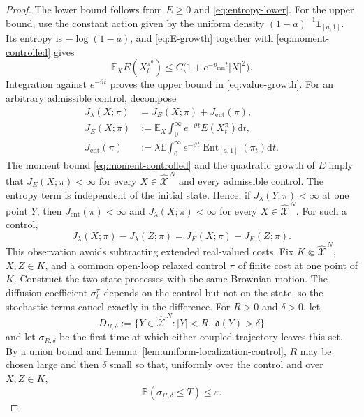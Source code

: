 \documentclass[11pt]{article}
\def\E{\mathbb{E}}
\def\P{\mathbb{P}}
\def\Xc{{\mathcal X}}
\def\id{\mathbf{1}}
\def\hX{\widehat{\Xc}^{\,N}}
\newcommand{\dd}{\mathrm{d}}
\newcommand{\Ent}{\operatorname{Ent}}
\newcommand{\pmin}{p_{\min}}
\theoremstyle{definition}
\theoremstyle{remark}
\numberwithin{equation}{section}
\begin{document}
\begin{proof}
The lower bound follows from $E\ge0$ and \eqref{eq:entropy-lower}.  For the upper bound, use the
constant action given by the uniform density $(1-a)^{-1}\id_{[a,1]}$.  Its entropy is
$-\log(1-a)$, and \eqref{eq:E-growth} together with \eqref{eq:moment-controlled} gives
\[
 \E_XE(X_t^{\pi^0})\le C\bigl(1+e^{-\pmin t}|X|^2\bigr).
\]
Integration against $e^{-\vartheta t}$ proves the upper bound in \eqref{eq:value-growth}.
For an arbitrary admissible control, decompose
\begin{align*}
 J_\lambda(X;\pi)
 &=J_E(X;\pi)+J_{\mathrm{ent}}(\pi),\\
 J_E(X;\pi)
 &:=\E_X\int_0^\infty e^{-\vartheta t}E(X_t^\pi)\dd t,\\
 J_{\mathrm{ent}}(\pi)
 &:=\lambda\E\int_0^\infty e^{-\vartheta t}
 \Ent_{[a,1]}(\pi_t)\dd t.
\end{align*}
The moment bound \eqref{eq:moment-controlled} and the quadratic growth of $E$ imply that
$J_E(X;\pi)<\infty$ for every $X\in\hX$ and every admissible control.  The entropy term is
independent of the initial state.  Hence, if $J_\lambda(Y;\pi)<\infty$ at one point $Y$, then
$J_{\mathrm{ent}}(\pi)<\infty$ and $J_\lambda(X;\pi)<\infty$ for every $X\in\hX$.  For such a
control,
\begin{equation}\label{eq:entropy-cancels-value-continuity}
 J_\lambda(X;\pi)-J_\lambda(Z;\pi)
 =J_E(X;\pi)-J_E(Z;\pi).
\end{equation}
This observation avoids subtracting extended real-valued costs.
Fix $K\Subset\hX$, $X,Z\in K$, and a common open-loop relaxed control $\pi$ of finite cost at one
point of $K$.  Construct the two state processes with the same Brownian motion.  The diffusion
coefficient $\sigma_t^\pi$ depends on the control but not on the state, so the stochastic terms
cancel exactly in the difference.  For $R>0$ and $\delta>0$, let
\begin{equation}\label{eq:safe-domain-value-continuity}
 D_{R,\delta}:=\{Y\in\hX:|Y|<R,\ \mathfrak d(Y)>\delta\}
\end{equation}
and let $\sigma_{R,\delta}$ be the first time at which either coupled trajectory leaves this set.
By a union bound and Lemma~\ref{lem:uniform-localization-control}, $R$ may be chosen large and then
$\delta$ small so that, uniformly over the control and over $X,Z\in K$,
\begin{equation}\label{eq:bad-event-value-continuity}
 \P(\sigma_{R,\delta}\le T)\le\varepsilon.
\end{equation}

\end{proof}
\end{document}
